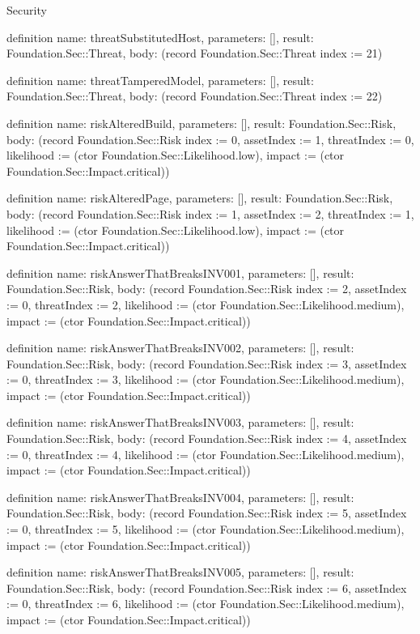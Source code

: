 \begin{lexlean}{Security}
\begin{semanticmodule}
definition{
  name: threatSubstitutedHost,
  parameters: [],
  result: Foundation.Sec::Threat,
  body: (record Foundation.Sec::Threat {index := 21})
}

definition{
  name: threatTamperedModel,
  parameters: [],
  result: Foundation.Sec::Threat,
  body: (record Foundation.Sec::Threat {index := 22})
}

definition{
  name: riskAlteredBuild,
  parameters: [],
  result: Foundation.Sec::Risk,
  body: (record Foundation.Sec::Risk {index := 0, assetIndex := 1, threatIndex := 0, likelihood := (ctor Foundation.Sec::Likelihood.low), impact := (ctor Foundation.Sec::Impact.critical)})
}

definition{
  name: riskAlteredPage,
  parameters: [],
  result: Foundation.Sec::Risk,
  body: (record Foundation.Sec::Risk {index := 1, assetIndex := 2, threatIndex := 1, likelihood := (ctor Foundation.Sec::Likelihood.low), impact := (ctor Foundation.Sec::Impact.critical)})
}

definition{
  name: riskAnswerThatBreaksINV001,
  parameters: [],
  result: Foundation.Sec::Risk,
  body: (record Foundation.Sec::Risk {index := 2, assetIndex := 0, threatIndex := 2, likelihood := (ctor Foundation.Sec::Likelihood.medium), impact := (ctor Foundation.Sec::Impact.critical)})
}

definition{
  name: riskAnswerThatBreaksINV002,
  parameters: [],
  result: Foundation.Sec::Risk,
  body: (record Foundation.Sec::Risk {index := 3, assetIndex := 0, threatIndex := 3, likelihood := (ctor Foundation.Sec::Likelihood.medium), impact := (ctor Foundation.Sec::Impact.critical)})
}

definition{
  name: riskAnswerThatBreaksINV003,
  parameters: [],
  result: Foundation.Sec::Risk,
  body: (record Foundation.Sec::Risk {index := 4, assetIndex := 0, threatIndex := 4, likelihood := (ctor Foundation.Sec::Likelihood.medium), impact := (ctor Foundation.Sec::Impact.critical)})
}

definition{
  name: riskAnswerThatBreaksINV004,
  parameters: [],
  result: Foundation.Sec::Risk,
  body: (record Foundation.Sec::Risk {index := 5, assetIndex := 0, threatIndex := 5, likelihood := (ctor Foundation.Sec::Likelihood.medium), impact := (ctor Foundation.Sec::Impact.critical)})
}

definition{
  name: riskAnswerThatBreaksINV005,
  parameters: [],
  result: Foundation.Sec::Risk,
  body: (record Foundation.Sec::Risk {index := 6, assetIndex := 0, threatIndex := 6, likelihood := (ctor Foundation.Sec::Likelihood.medium), impact := (ctor Foundation.Sec::Impact.critical)})
}


\end{semanticmodule}
\end{lexlean}
